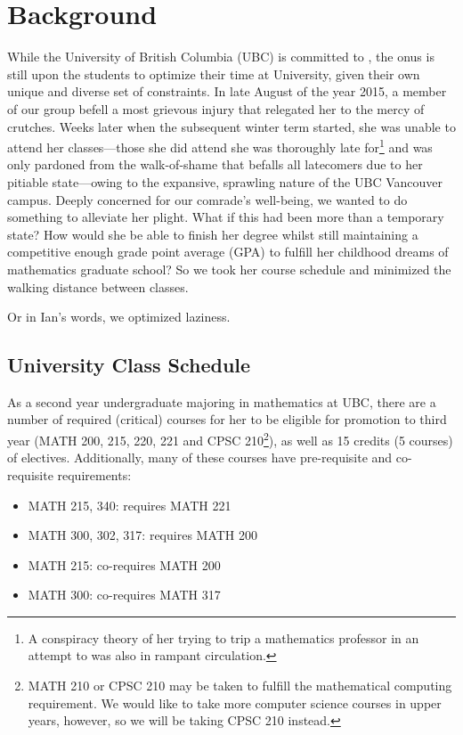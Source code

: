 \documentclass[11pt, oneside]{article}   	%
\begin{document}
\cleardoublepage
\setcounter{page}{1}    %

\section{Background}

While the University of British Columbia (UBC) is committed to  \cite{ref:access}, the onus is still upon the students to optimize their time at University, given their own unique and diverse set of constraints. In late August of the year 2015, a member of our group befell a most grievous injury that relegated her to the mercy of crutches. Weeks later when the subsequent winter term started, she was unable to attend her classes---those she did attend she was thoroughly late for\footnote{A conspiracy theory of her trying to trip a mathematics professor in an attempt to  was also in rampant circulation.} and was only pardoned from the walk-of-shame that befalls all latecomers due to her pitiable state---owing to the expansive, sprawling nature of the UBC Vancouver campus. Deeply concerned for our comrade's well-being, we wanted to do something to alleviate her plight. What if this had been more than a temporary state? How would she be able to finish her degree whilst still maintaining a competitive enough grade point average (GPA) to fulfill her childhood dreams of mathematics graduate school? So we took her course schedule and minimized the walking distance between classes.

Or in Ian's words, we optimized laziness.

\subsection{University Class Schedule}
As a second year undergraduate majoring in mathematics at UBC, there are a number of required (critical) courses for her to be eligible for promotion to third year (MATH 200, 215, 220, 221 and CPSC 210\footnote{MATH 210 or CPSC 210 may be taken to fulfill the mathematical computing requirement. We would like to take more computer science courses in upper years, however, so we will be taking CPSC 210 instead.}), as well as 15 credits (5 courses) of electives. Additionally, many of these courses have pre-requisite and co-requisite requirements: 
\begin{itemize}
\item MATH 215, 340: requires MATH 221
\item MATH 300, 302, 317: requires MATH 200
\item MATH 215: co-requires MATH 200
\item MATH 300: co-requires MATH 317
\end{itemize}
\end{document}
